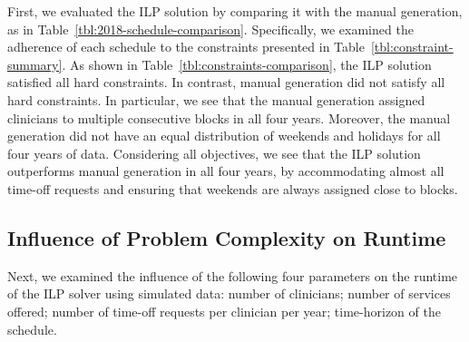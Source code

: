 

First, we evaluated the ILP solution by comparing it with the
manual generation, as in Table~\ref{tbl:2018-schedule-comparison}. Specifically, we examined the adherence of each
schedule to the constraints presented in Table~\ref{tbl:constraint-summary}. As
shown in Table~\ref{tbl:constraints-comparison}, the ILP solution satisfied all 
hard constraints. In contrast,
manual generation did not satisfy all hard constraints. In
particular, we see that the manual generation assigned clinicians to multiple
consecutive blocks in all four years. Moreover, the manual generation did not have
an equal distribution of weekends and holidays for all four years of data.
Considering all objectives, we see that the ILP solution outperforms manual generation
in all four years, by accommodating almost all time-off requests and
ensuring that weekends are always assigned close to blocks.



\subsection{Influence of Problem Complexity on Runtime}
Next, we examined the influence of the following four parameters on the
runtime of the ILP solver using simulated data:
number of clinicians;
number of services offered;
number of time-off requests per clinician per year;
time-horizon of the schedule.

